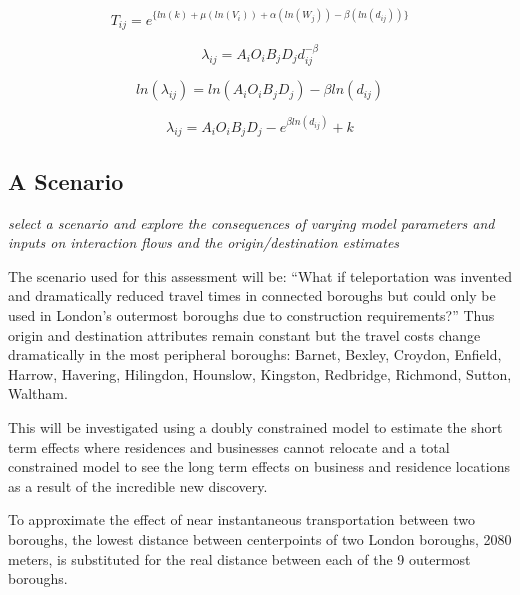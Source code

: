 \documentclass[11pt]{article} %
\begin{document}

\begin{equation}
T_{ij} = e^ { \{ ln(k) + \mu (ln(V_i)) +  \alpha( ln(W_j)) - \beta (ln(d_{ij})) \}}
\end{equation}


\begin{equation}
\lambda_{ij} = A_i O_i  B_j D_j d_{ij}^{-\beta}
\end{equation}

\begin{equation}
ln(\lambda_{ij}) = ln(A_i O_i  B_j D_j) - \beta ln( d_{ij})
\end{equation}


\begin{equation}
\lambda_{ij} = A_i O_i  B_j D_j - e ^{ \beta ln( d_{ij})} + k
\end{equation}



\subsection{A Scenario}

\textit{select a scenario and explore the consequences of varying model parameters and inputs on interaction flows and the origin/destination estimates}

The scenario used for this assessment will be: ``What if teleportation  was invented and dramatically reduced travel times in connected boroughs but could only be used in London's outermost boroughs due to construction requirements?'' Thus origin and destination attributes remain constant but the travel costs change dramatically in the most peripheral boroughs: Barnet, Bexley, Croydon, Enfield, Harrow, Havering, Hilingdon, Hounslow, Kingston, Redbridge, Richmond, Sutton, Waltham. 


This will be investigated using a doubly constrained model to estimate the short term effects where residences and businesses cannot relocate and a total constrained model to see the long term effects on business and residence locations as a result of the incredible new discovery. 

To approximate the effect of near instantaneous transportation between two boroughs, the lowest distance between centerpoints of two London boroughs, 2080 meters, is substituted for the real distance between each of the 9 outermost boroughs. 
\end{document}
